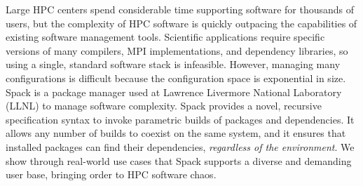 
Large HPC centers spend considerable time supporting software for thousands of users, but the complexity of HPC software is quickly outpacing the capabilities of existing software management tools. Scientific applications require specific versions of many compilers, MPI implementations, and dependency libraries, so using a single, standard software stack is infeasible.  However, managing many configurations is difficult because the configuration space is exponential in size.
%
Spack is a package manager used at Lawrence Livermore National Laboratory (LLNL) to manage software complexity. Spack provides a novel, recursive specification syntax to invoke parametric builds of packages and dependencies.  It allows any number of builds to coexist on the same system, and it ensures that installed packages can find their dependencies, {\it regardless of the environment}. We show through real-world use cases that Spack supports a diverse and demanding user base, bringing order to HPC software chaos.
